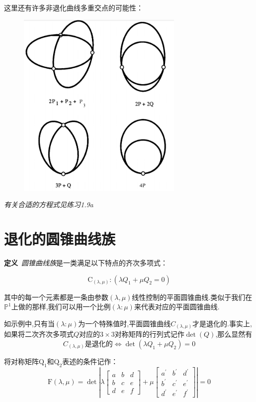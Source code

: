 \documentclass[UTF8]{book}
\begin{document}
		
		这里还有许多非退化曲线多重交点的可能性：
		\begin{figure}[H]
		  \centering
		  \includegraphics[width=8cm]{21.jpg}
		\end{figure}
	
	
		\textit{有关合适的方程式见\textit{练习1.9a}}
		
		\section{退化的圆锥曲线族}
		\textbf{定义}\ \textit{圆锥曲线族}是一类满足以下特点的齐次多项式：
		
		\begin{equation*}
		\mathrm{C}_{(\lambda, \mu)} :\left(\lambda Q_{1}+\mu Q_{2}=0\right)
		\end{equation*}
		
		其中的每一个元素都是一条由参数$(\lambda, \mu)$线性控制的平面圆锥曲线.类似于我们在$\mathbb{P}^{1}$上做的那样,我们可以用一个比例$(\lambda : \mu)$来代表对应的平面圆锥曲线.
		
		
		如示例中,只有当$(\lambda : \mu)$为一个特殊值时,平面圆锥曲线$C_{(\lambda, \mu)}$才是退化的.事实上,如果将二次齐次多项式$Q$对应的$3 \times 3$对称矩阵的行列式记作$\operatorname{det}(Q)$,那么显然有
		\begin{equation*}
		C_{(\lambda, \mu)} \text {是退化的} \Longleftrightarrow \operatorname{det}\left(\lambda Q_{1}+\mu Q_{2}\right)=0
		\end{equation*}
		
		
		将对称矩阵$\mathrm{Q}_{1}$和$\mathrm{Q}_{2}$表述的条件记作：
		\begin{equation*}
		\mathrm{F}(\lambda, \mu)=\operatorname{det}\left|\lambda\left[\begin{array}{ccc}{a} & {b} & {d} \\ {b} & {c} & {e} \\ {d} & {e} & {f}\end{array}\right]+\mu\left[\begin{array}{ccc}{a^{\prime}} & {b^{\prime}} & {d^{\prime}} \\ {b^{\prime}} & {c^{\prime}} & {e^{\prime}} \\ {d^{\prime}} & {e^{\prime}} & {f^{\prime}}\end{array}\right]\right|=0
		\end{equation*}
		
\end{document}
